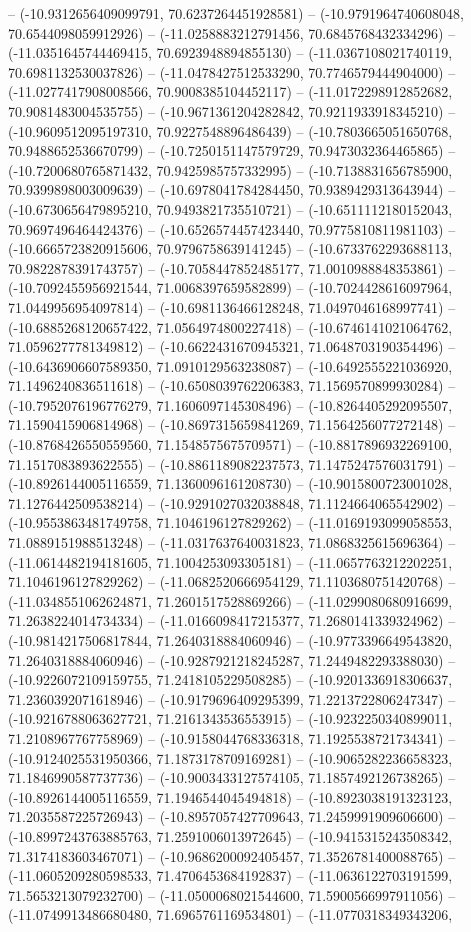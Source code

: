 -- (-10.9312656409099791, 70.6237264451928581) -- (-10.9791964740608048, 70.6544098059912926) -- (-11.0258883212791456, 70.6845768432334296) -- (-11.0351645744469415, 70.6923948894855130) -- (-11.0367108021740119, 70.6981132530037826) -- (-11.0478427512533290, 70.7746579444904000) -- (-11.0277417908008566, 70.9008385104452117) -- (-11.0172298912852682, 70.9081483004535755) -- (-10.9671361204282842, 70.9211933918345210) -- (-10.9609512095197310, 70.9227548896486439) -- (-10.7803665051650768, 70.9488652536670799) -- (-10.7250151147579729, 70.9473032364465865) -- (-10.7200680765871432, 70.9425985757332995) -- (-10.7138831656785900, 70.9399898003009639) -- (-10.6978041784284450, 70.9389429313643944) -- (-10.6730656479895210, 70.9493821735510721) -- (-10.6511112180152043, 70.9697496464424376) -- (-10.6526574457423440, 70.9775810811981103) -- (-10.6665723820915606, 70.9796758639141245) -- (-10.6733762293688113, 70.9822878391743757) -- (-10.7058447852485177, 71.0010988848353861) -- (-10.7092455956921544, 71.0068397659582899) -- (-10.7024428616097964, 71.0449956954097814) -- (-10.6981136466128248, 71.0497046168997741) -- (-10.6885268120657422, 71.0564974800227418) -- (-10.6746141021064762, 71.0596277781349812) -- (-10.6622431670945321, 71.0648703190354496) -- (-10.6436906607589350, 71.0910129563238087) -- (-10.6492555221036920, 71.1496240836511618) -- (-10.6508039762206383, 71.1569570899930284) -- (-10.7952076196776279, 71.1606097145308496) -- (-10.8264405292095507, 71.1590415906814968) -- (-10.8697315659841269, 71.1564256077272148) -- (-10.8768426550559560, 71.1548575675709571) -- (-10.8817896932269100, 71.1517083893622555) -- (-10.8861189082237573, 71.1475247576031791) -- (-10.8926144005116559, 71.1360096161208730) -- (-10.9015800723001028, 71.1276442509538214) -- (-10.9291027032038848, 71.1124664065542902) -- (-10.9553863481749758, 71.1046196127829262) -- (-11.0169193099058553, 71.0889151988513248) -- (-11.0317637640031823, 71.0868325615696364) -- (-11.0614482194181605, 71.1004253093305181) -- (-11.0657763212202251, 71.1046196127829262) -- (-11.0682520666954129, 71.1103680751420768) -- (-11.0348551062624871, 71.2601517528869266) -- (-11.0299080680916699, 71.2638224014734334) -- (-11.0166098417215377, 71.2680141339324962) -- (-10.9814217506817844, 71.2640318884060946) -- (-10.9773396649543820, 71.2640318884060946) -- (-10.9287921218245287, 71.2449482293388030) -- (-10.9226072109159755, 71.2418105229508285) -- (-10.9201336918306637, 71.2360392071618946) -- (-10.9179696409295399, 71.2213722806247347) -- (-10.9216788063627721, 71.2161343536553915) -- (-10.9232250340899011, 71.2108967767758969) -- (-10.9158044768336318, 71.1925538721734341) -- (-10.9124025531950366, 71.1873178709169281) -- (-10.9065282236658323, 71.1846990587737736) -- (-10.9003433127574105, 71.1857492126738265) -- (-10.8926144005116559, 71.1946544045494818) -- (-10.8923038191323123, 71.2035587225726943) -- (-10.8957057427709643, 71.2459991909606600) -- (-10.8997243763885763, 71.2591006013972645) -- (-10.9415315243508342, 71.3174183603467071) -- (-10.9686200092405457, 71.3526781400088765) -- (-11.0605209280598533, 71.4706453684192837) -- (-11.0636122703191599, 71.5653213079232700) -- (-11.0500068021544600, 71.5900566997911056) -- (-11.0749913486680480, 71.6965761169534801) -- (-11.0770318349343206, 